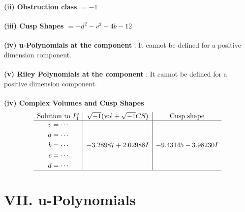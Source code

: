 \documentclass[1p]{elsarticle_modified}
\theoremstyle{definition}
\newcommand{\I}{\sqrt{-1}}
\begin{document}
\flushleft \textbf{(ii) Obstruction class $= -1$}\\~\\
\flushleft \textbf{(iii) Cusp Shapes $= - d^2- v^2+4 b-12$}\\~\\
\flushleft \textbf{(iv) u-Polynomials at the component} : It cannot be defined for a positive dimension component.\\~\\
\flushleft \textbf{(v) Riley Polynomials at the component} : It cannot be defined for a positive dimension component.\\~\\
\newpage\flushleft \textbf{(iv) Complex Volumes and Cusp Shapes}
$$\begin{array}{c|c|c} 
\text{Solution to }I^v_{4}& \I (\text{vol} + \sqrt{-1}CS) & \text{Cusp shape}\\
 \hline 
\begin{aligned}
v &= \cdots \\
a &= \cdots \\
b &= \cdots \\
c &= \cdots \\
d &= \cdots\end{aligned}
 & -3.28987 + 2.02988 I & -9.43145 - 3.98230 I\\
 \hline 
 \end{array}
$$
\newpage\renewcommand{\arraystretch}{1}
\centering \section*{ VII. u-Polynomials}
\end{document}
